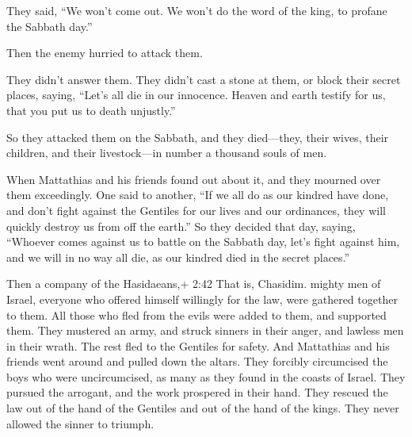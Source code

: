  They said, ``We won't come out. We won't do the word of
the king, to profane the Sabbath day.''

 Then the enemy hurried to attack them.

 They didn't answer them. They didn't cast a stone at them,
or block their secret places,  saying, ``Let's all die in
our innocence. Heaven and earth testify for us, that you put us to death
unjustly.''

 So they attacked them on the Sabbath, and they
died---they, their wives, their children, and their livestock---in
number a thousand souls of men.

 When Mattathias and his friends found out about it, and
they mourned over them exceedingly.  One said to another,
``If we all do as our kindred have done, and don't fight against the
Gentiles for our lives and our ordinances, they will quickly destroy us
from off the earth.''  So they decided that day, saying,
``Whoever comes against us to battle on the Sabbath day, let's fight
against him, and we will in no way all die, as our kindred died in the
secret places.''

 Then a company of the Hasidaeans,+ 2:42 That is, Chasidim.
mighty men of Israel, everyone who offered himself willingly for the
law, were gathered together to them.  All those who fled
from the evils were added to them, and supported them. 
They mustered an army, and struck sinners in their anger, and lawless
men in their wrath. The rest fled to the Gentiles for safety.
 And Mattathias and his friends went around and pulled down
the altars.  They forcibly circumcised the boys who were
uncircumcised, as many as they found in the coasts of Israel.
 They pursued the arrogant, and the work prospered in their
hand.  They rescued the law out of the hand of the Gentiles
and out of the hand of the kings. They never allowed the sinner to
triumph.

